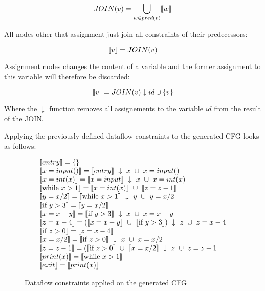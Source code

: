 \[ JOIN(v) = \bigcup_{ w \in pred(v)} \llbracket w \rrbracket \]

All nodes other that assignment just join all constraints of their predecessors:

\[ \llbracket v \rrbracket = JOIN(v) \]

Assignment nodes changes the content of a variable and the former assignment to this variable will therefore be discarded:

\[ \llbracket v \rrbracket = JOIN(v) \downarrow id \cup \{ v \} \]

Where the $\downarrow$ function removes all assignements to the variable $id$ from the result of the JOIN.

Applying the previously defined dataflow constraints to the generated CFG looks as follows:

\begin{figure}[H]
\[
\begin{array}{l}
  \llbracket entry \rrbracket = \{\}\\
  \llbracket x = input() \rrbracket = \llbracket entry \rrbracket ~ \downarrow ~ x ~ \cup ~ x = input()\\
  \llbracket x = int(x) \rrbracket = \llbracket x = input \rrbracket ~ \downarrow ~ x ~ \cup ~ x = int(x)\\
  \llbracket \text{while } x > 1 \rrbracket = \llbracket x = int(x) \rrbracket ~ \cup ~ \llbracket z = z - 1 \rrbracket\\
  \llbracket  y = x / 2 \rrbracket = \llbracket \text{while } x > 1 \rrbracket ~ \downarrow ~ y ~ \cup ~ y = x / 2\\
  \llbracket \text{if } y > 3 \rrbracket = \llbracket  y = x / 2 \rrbracket\\
  \llbracket  x = x-y \rrbracket = \llbracket \text{if } y > 3 \rrbracket ~ \downarrow ~ x ~ \cup ~ x = x-y\\
  \llbracket  z = x-4 \rrbracket = (\llbracket x = x-y \rrbracket ~ \cup ~ \llbracket \text{if } y > 3 \rrbracket) ~ \downarrow ~ z ~ \cup ~ z = x-4\\
  \llbracket \text{if } z > 0 \rrbracket = \llbracket z = x - 4 \rrbracket\\
  \llbracket x = x / 2 \rrbracket = \llbracket \text{if } z > 0 \rrbracket ~ \downarrow ~ x ~ \cup ~ x = x/2\\
  \llbracket z = z - 1 \rrbracket = (\llbracket \text{if } z > 0 \rrbracket ~ \cup ~ \llbracket x = x / 2 \rrbracket ~ \downarrow ~ z ~ \cup ~ z = z - 1\\
  \llbracket print(x) \rrbracket = \llbracket \text{while } x > 1 \rrbracket\\
  \llbracket exit \rrbracket = \llbracket print(x) \rrbracket
\end{array}
\]
\caption{Dataflow constraints applied on the generated CFG}
\end{figure}

